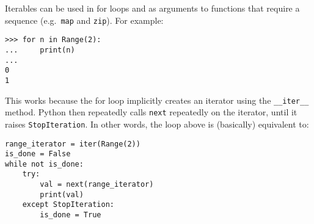 Iterables can be used in for loops and as arguments to functions that require a
sequence (e.g.\ \lstinline$map$ and \lstinline$zip$). For example:
\begin{lstlisting}
>>> for n in Range(2):
...     print(n)
...
0
1
\end{lstlisting}

This works because the for loop implicitly creates an iterator using the
\lstinline$__iter__$ method. Python then repeatedly calls \lstinline$next$
repeatedly on the iterator, until it raises \lstinline$StopIteration$. In other
words, the loop above is (basically) equivalent to:

\begin{blocksection}
\begin{lstlisting}
range_iterator = iter(Range(2))
is_done = False
while not is_done:
    try:
        val = next(range_iterator)
        print(val)
    except StopIteration:
        is_done = True
\end{lstlisting}
\end{blocksection}
